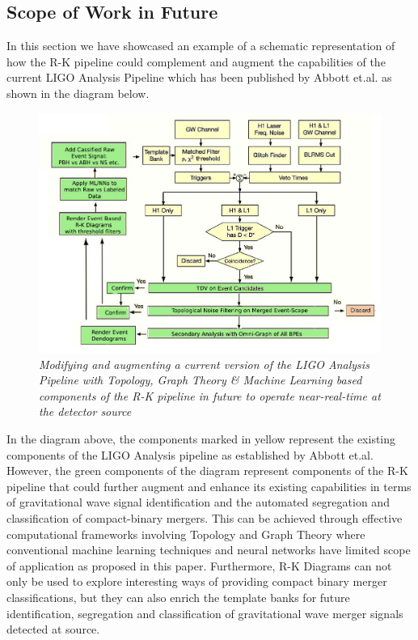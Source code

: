 \subsection{Scope of Work in Future}

In this section we have showcased an example of a schematic representation of how the R-K pipeline could complement and augment the capabilities of  the current LIGO Analysis Pipeline which has been published by Abbott et.al. \cite{00.6_LIGOAnalysisPipeline} as shown in the diagram below.

\begin{figure}[H]
	\centering
	\includegraphics[width=1.0\linewidth]{images/Modified-TDA-LIGO-Analysis-Pipeline.jpg}
	\caption{\textit{Modifying and augmenting a current version of the LIGO Analysis Pipeline with
			Topology, Graph Theory \& Machine Learning based components of the R-K pipeline in future to operate near-real-time at the detector source}}
	\label{fig:odified-TDA-LIGO-Analysis-Pipeline}
\end{figure}

In the diagram above, the components marked in yellow represent the existing components of the LIGO Analysis pipeline  as established by Abbott et.al.\cite{00.6_LIGOAnalysisPipeline} However, the green components of the diagram represent components of the R-K pipeline that could further augment and enhance its existing capabilities in terms of gravitational wave signal identification and the automated segregation and classification of compact-binary mergers. This can be achieved through effective computational frameworks involving Topology and Graph Theory where conventional machine learning techniques and neural networks have limited scope of application as proposed in this paper. Furthermore, R-K Diagrams can not only be used to explore  interesting ways of providing compact binary merger classifications, but they can also enrich the template banks for future identification, segregation and classification of gravitational wave merger signals detected at source.

